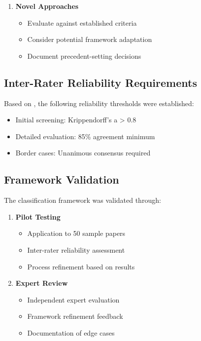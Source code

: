 \documentclass[a4paper,12pt]{article}
\begin{document}
\begin{enumerate}
\begin{enumerate}
    \item \textbf{Novel Approaches}
    \begin{itemize}
        \item Evaluate against established criteria
        \item Consider potential framework adaptation
        \item Document precedent-setting decisions
    \end{itemize}
\end{enumerate}

\subsection{Inter-Rater Reliability Requirements}
Based on \cite{krippendorff2004reliability}, the following reliability thresholds were established:

\begin{itemize}
    \item Initial screening: Krippendorff's a > 0.8
    \item Detailed evaluation: 85\% agreement minimum
    \item Border cases: Unanimous consensus required
\end{itemize}

\subsection{Framework Validation}
The classification framework was validated through:

\begin{enumerate}
    \item \textbf{Pilot Testing}
    \begin{itemize}
        \item Application to 50 sample papers
        \item Inter-rater reliability assessment
        \item Process refinement based on results
    \end{itemize}
    
    \item \textbf{Expert Review}
    \begin{itemize}
        \item Independent expert evaluation
        \item Framework refinement feedback
        \item Documentation of edge cases
    \end{itemize}
    

\end{enumerate}
\end{enumerate}
\end{document}
